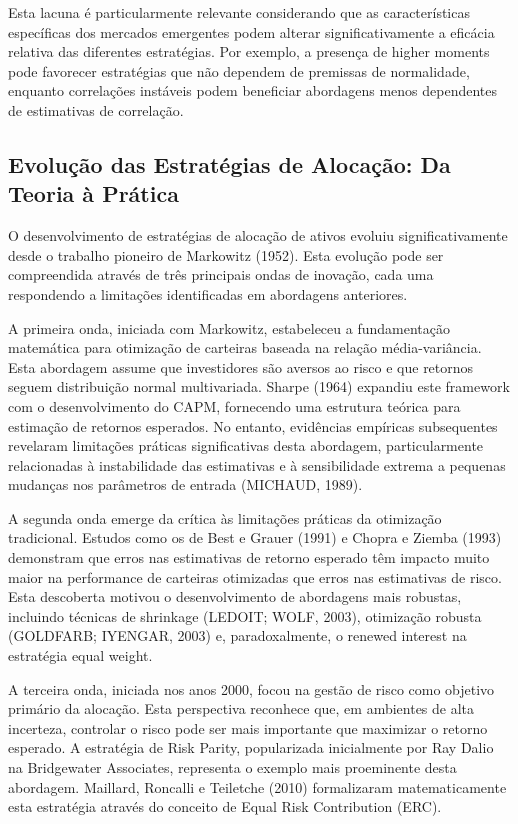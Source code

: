 Esta lacuna é particularmente relevante considerando que as características específicas dos mercados emergentes podem alterar significativamente a eficácia relativa das diferentes estratégias. Por exemplo, a presença de higher moments pode favorecer estratégias que não dependem de premissas de normalidade, enquanto correlações instáveis podem beneficiar abordagens menos dependentes de estimativas de correlação.

\subsection{Evolução das Estratégias de Alocação: Da Teoria à Prática}

O desenvolvimento de estratégias de alocação de ativos evoluiu significativamente desde o trabalho pioneiro de Markowitz (1952). Esta evolução pode ser compreendida através de três principais ondas de inovação, cada uma respondendo a limitações identificadas em abordagens anteriores.

A primeira onda, iniciada com Markowitz, estabeleceu a fundamentação matemática para otimização de carteiras baseada na relação média-variância. Esta abordagem assume que investidores são aversos ao risco e que retornos seguem distribuição normal multivariada. Sharpe (1964) expandiu este framework com o desenvolvimento do CAPM, fornecendo uma estrutura teórica para estimação de retornos esperados. No entanto, evidências empíricas subsequentes revelaram limitações práticas significativas desta abordagem, particularmente relacionadas à instabilidade das estimativas e à sensibilidade extrema a pequenas mudanças nos parâmetros de entrada (MICHAUD, 1989).

A segunda onda emerge da crítica às limitações práticas da otimização tradicional. Estudos como os de Best e Grauer (1991) e Chopra e Ziemba (1993) demonstram que erros nas estimativas de retorno esperado têm impacto muito maior na performance de carteiras otimizadas que erros nas estimativas de risco. Esta descoberta motivou o desenvolvimento de abordagens mais robustas, incluindo técnicas de shrinkage (LEDOIT; WOLF, 2003), otimização robusta (GOLDFARB; IYENGAR, 2003) e, paradoxalmente, o renewed interest na estratégia equal weight.

A terceira onda, iniciada nos anos 2000, focou na gestão de risco como objetivo primário da alocação. Esta perspectiva reconhece que, em ambientes de alta incerteza, controlar o risco pode ser mais importante que maximizar o retorno esperado. A estratégia de Risk Parity, popularizada inicialmente por Ray Dalio na Bridgewater Associates, representa o exemplo mais proeminente desta abordagem. Maillard, Roncalli e Teiletche (2010) formalizaram matematicamente esta estratégia através do conceito de Equal Risk Contribution (ERC).

